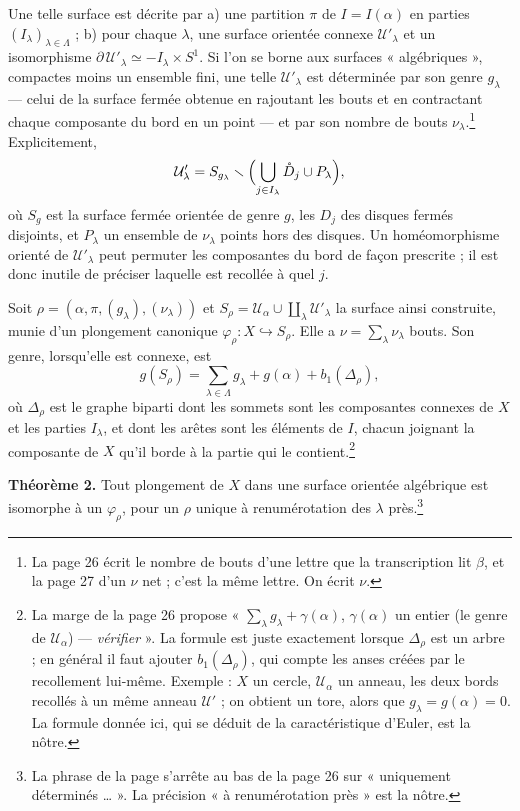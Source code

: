 \documentclass[11pt,a4paper]{article}
\begin{document}
Une telle surface est décrite par a) une partition $\pi$ de $I = I(\alpha)$
en parties $(I_\lambda)_{\lambda \in \Lambda}$ ; b) pour chaque $\lambda$,
une surface orientée connexe $\mathcal{U}'_\lambda$ et un isomorphisme
$\partial\,\mathcal{U}'_\lambda \simeq -I_\lambda \times S^{1}$. Si l'on se
borne aux surfaces « algébriques », compactes moins un ensemble fini, une
telle $\mathcal{U}'_\lambda$ est déterminée par son genre $g_\lambda$ --- celui
de la surface fermée obtenue en rajoutant les bouts et en contractant chaque
composante du bord en un point --- et par son nombre de bouts
$\nu_\lambda$.\footnote{La page 26 écrit le nombre de bouts d'une lettre que
la transcription lit $\beta$, et la page 27 d'un $\nu$ net ; c'est la même
lettre. On écrit $\nu$.} Explicitement,
\[
\mathcal{U}'_\lambda = S_{g_\lambda} \smallsetminus \Bigl(\bigcup_{j \in I_\lambda} \mathring{D}_j \cup P_\lambda\Bigr),
\]
où $S_g$ est la surface fermée orientée de genre $g$, les $D_j$ des disques
fermés disjoints, et $P_\lambda$ un ensemble de $\nu_\lambda$ points hors des
disques. Un homéomorphisme orienté de $\mathcal{U}'_\lambda$ peut permuter
les composantes du bord de façon prescrite ; il est donc inutile de préciser
laquelle est recollée à quel $j$.

Soit $\rho = (\alpha, \pi, (g_\lambda), (\nu_\lambda))$ et
$S_\rho = \mathcal{U}_\alpha \cup \coprod_\lambda \mathcal{U}'_\lambda$ la
surface ainsi construite, munie d'un plongement canonique
$\varphi_\rho : X \hookrightarrow S_\rho$. Elle a
$\nu = \sum_\lambda \nu_\lambda$ bouts. Son genre, lorsqu'elle est connexe, est
\[
g(S_\rho) = \sum_{\lambda \in \Lambda} g_\lambda + g(\alpha) + b_1(\Delta_\rho),
\]
où $\Delta_\rho$ est le graphe biparti dont les sommets sont les composantes
connexes de $X$ et les parties $I_\lambda$, et dont les arêtes sont les
éléments de $I$, chacun joignant la composante de $X$ qu'il borde à la partie
qui le contient.\footnote{La marge de la page 26 propose
« $\sum_\lambda g_\lambda + \gamma(\alpha)$, $\gamma(\alpha)$ un entier (le
genre de $\mathcal{U}_\alpha$) --- \emph{vérifier} ». La formule est juste
exactement lorsque $\Delta_\rho$ est un arbre ; en général il faut ajouter
$b_1(\Delta_\rho)$, qui compte les anses créées par le recollement
lui-même. Exemple : $X$ un cercle, $\mathcal{U}_\alpha$ un anneau, les deux
bords recollés à un même anneau $\mathcal{U}'$ ; on obtient un tore, alors
que $g_\lambda = g(\alpha) = 0$. La formule donnée ici, qui se déduit de la
caractéristique d'Euler, est la nôtre.}

\textbf{Théorème 2.} Tout plongement de $X$ dans une surface orientée
algébrique est isomorphe à un $\varphi_\rho$, pour un $\rho$ unique à
renumérotation des $\lambda$ près.\footnote{La phrase de la page s'arrête au
bas de la page 26 sur « uniquement déterminés … ». La précision « à
renumérotation près » est la nôtre.}
\end{document}
